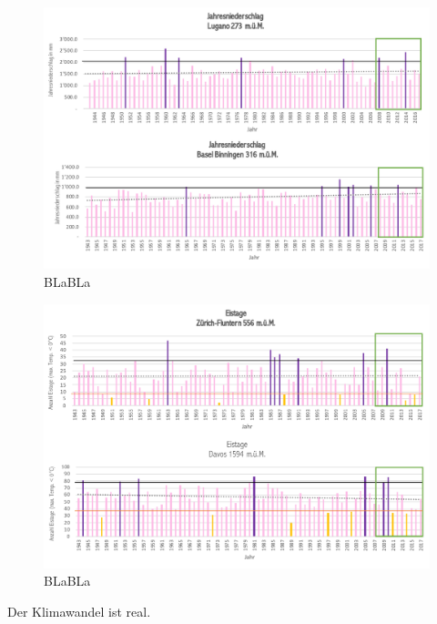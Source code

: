 \begin{refsection}
\begin{figure}
\centering
\includegraphics[width=1.0\textwidth]{extrem/Jahresniederschlag.pdf}
\caption{BLaBLa}
\label{Jahresniederschlag}
\end{figure}

\begin{figure}
\centering
\includegraphics[width=1.0\textwidth]{extrem/Eistage.pdf}
\caption{BLaBLa}
\label{Eistage}
\end{figure}


Der Klimawandel ist real.




\printbibliography[heading=subbibliography]
\end{refsection}
